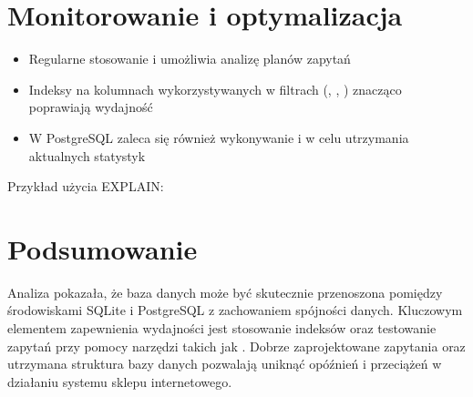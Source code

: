 \documentclass[letterpaper,10pt,english]{sphinxmanual}
\begin{document}
\section{Monitorowanie i optymalizacja}
\label{\detokenize{rozdzial4/index:monitorowanie-i-optymalizacja}}\begin{itemize}
\item {} 
\sphinxAtStartPar
Regularne stosowanie  i  umożliwia analizę planów zapytań

\item {} 
\sphinxAtStartPar
Indeksy na kolumnach wykorzystywanych w filtrach (, , ) znacząco poprawiają wydajność

\item {} 
\sphinxAtStartPar
W PostgreSQL zaleca się również wykonywanie  i  w celu utrzymania aktualnych statystyk

\end{itemize}

\sphinxAtStartPar
Przykład użycia EXPLAIN:

\begin{sphinxVerbatim}[commandchars=\\\{\}]

\end{sphinxVerbatim}


\section{Podsumowanie}
\label{\detokenize{rozdzial4/index:podsumowanie}}
\sphinxAtStartPar
Analiza pokazała, że baza danych może być skutecznie przenoszona pomiędzy środowiskami SQLite i PostgreSQL z zachowaniem spójności danych. Kluczowym elementem zapewnienia wydajności jest stosowanie indeksów oraz testowanie zapytań przy pomocy narzędzi takich jak . Dobrze zaprojektowane zapytania oraz utrzymana struktura bazy danych pozwalają uniknąć opóźnień i przeciążeń w działaniu systemu sklepu internetowego.
\end{document}
